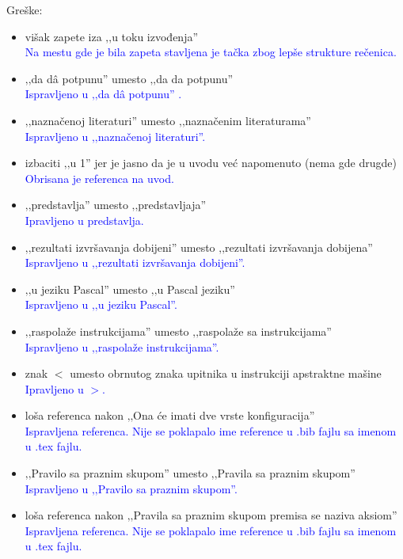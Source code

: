 \documentclass[a4paper]{report}
\newcommand{\odgovor}[1]{\textcolor{blue}{#1}}
\begin{document}
Greške:
\begin{itemize}
	\item višak zapete iza ‚‚u toku izvođenja'' \\
	\odgovor{Na mestu gde je bila zapeta stavljena je tačka zbog lepše strukture rečenica.} 
	\item ‚‚da d\^{a} potpunu'' umesto ‚‚da da potpunu''\\
	\odgovor{Ispravljeno u ‚‚da d\^{a} potpunu'' .}
	\item ‚‚naznačenoj literaturi'' umesto ‚‚naznačenim literaturama''\\
	\odgovor{Ispravljeno u ‚‚naznačenoj literaturi''.}
	\item izbaciti ‚‚u 1'' jer je jasno da je u uvodu već napomenuto (nema gde drugde)\\
	\odgovor{Obrisana je referenca na uvod.}
	\item ‚‚predstavlja'' umesto ‚‚predstavljaja''\\
	\odgovor{Ipravljeno u predstavlja.}
	\item ‚‚rezultati izvršavanja dobijeni'' umesto ‚‚rezultati izvršavanja dobijena''\\
	 \odgovor{Ispravljeno u ‚‚rezultati izvršavanja dobijeni''. }
	\item ‚‚u jeziku Pascal'' umesto ‚‚u Pascal jeziku''\\
	\odgovor{Ispravljeno u ‚‚u jeziku Pascal''.}
	\item ‚‚raspolaže instrukcijama'' umesto ‚‚raspolaže sa instrukcijama''\\
	 \odgovor{Ispravljeno u ‚‚raspolaže instrukcijama''.}
	\item znak \textit{$<$} umesto obrnutog znaka upitnika u instrukciji apstraktne mašine\\
	\odgovor{Ipravljeno u \textit{$>$}.}
	\item loša referenca nakon ‚‚Ona će imati dve vrste konfiguracija''\\
	\odgovor{Ispravljena referenca. Nije se poklapalo ime reference u .bib fajlu sa imenom u .tex fajlu.}
	\item ‚‚Pravilo sa praznim skupom'' umesto ‚‚Pravila sa praznim skupom''\\
	\odgovor{Ispravljeno u ‚‚Pravilo sa praznim skupom''.}
	\item loša referenca nakon ‚‚Pravila sa praznim skupom premisa se naziva aksiom''\\
	\odgovor{Ispravljena referenca. Nije se poklapalo ime reference u .bib fajlu sa imenom u .tex fajlu.}

\end{itemize}
\end{document}
